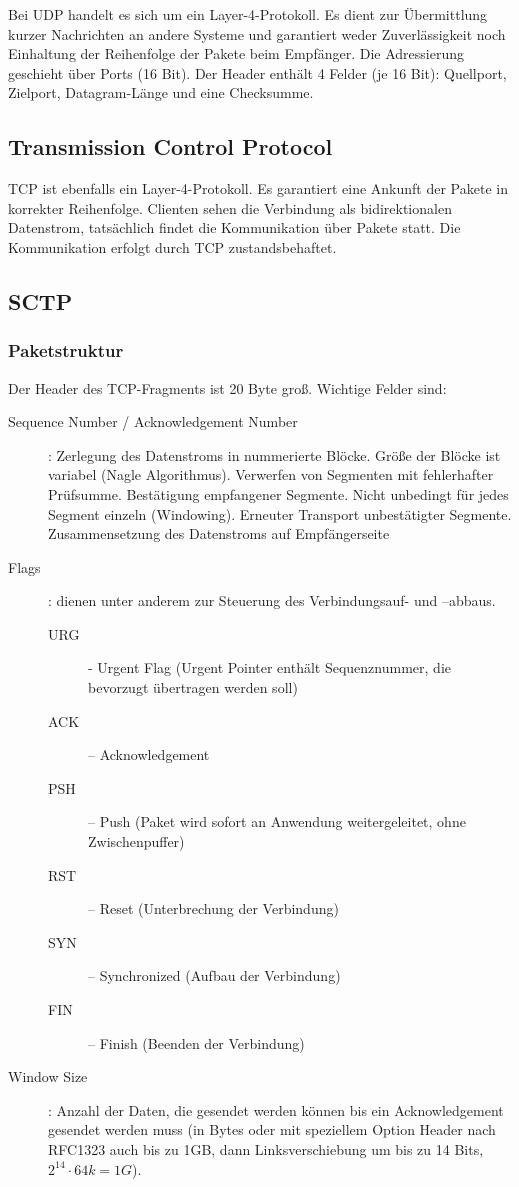 \documentclass{article} %
\begin{document}
Bei UDP handelt es sich um ein Layer-4-Protokoll.\cite{rfc768}
Es dient zur Übermittlung kurzer Nachrichten an andere Systeme und garantiert weder Zuverlässigkeit noch Einhaltung der Reihenfolge der Pakete beim Empfänger.
Die Adressierung geschieht über Ports (16 Bit).
Der Header enthält 4 Felder (je 16 Bit): Quellport, Zielport, Datagram-Länge und eine Checksumme.

\subsection{Transmission Control Protocol}
TCP ist ebenfalls ein Layer-4-Protokoll.\cite{rfc793}
Es garantiert eine Ankunft der Pakete in korrekter Reihenfolge.
Clienten sehen die Verbindung als bidirektionalen Datenstrom, tatsächlich findet die Kommunikation über Pakete statt. Die Kommunikation erfolgt durch TCP zustandsbehaftet.

\subsection{SCTP}


\subsubsection{Paketstruktur}

Der Header des TCP-Fragments ist 20 Byte groß.
Wichtige Felder sind:
\begin{description}
	\item [Sequence Number / Acknowledgement Number]: Zerlegung des Datenstroms in nummerierte Blöcke.
	Größe der Blöcke ist variabel (Nagle Algorithmus).
	Verwerfen von Segmenten mit fehlerhafter Prüfsumme.
	Bestätigung empfangener Segmente.
	Nicht unbedingt für jedes Segment einzeln (Windowing).
	Erneuter Transport unbestätigter Segmente.
	Zusammensetzung des Datenstroms auf Empfängerseite
	
	\item [Flags]: dienen unter anderem zur Steuerung des Verbindungsauf- und –abbaus.
	\begin{description}
		\item [URG] - Urgent Flag (Urgent Pointer enthält
			Sequenznummer, die bevorzugt übertragen werden soll)
		\item [ACK] – Acknowledgement
		\item [PSH] – Push (Paket wird sofort an Anwendung weitergeleitet, ohne Zwischenpuffer)
		\item [RST] – Reset (Unterbrechung der Verbindung)
		\item [SYN] – Synchronized (Aufbau der Verbindung)
		\item [FIN] – Finish (Beenden der Verbindung)
	\end{description}
	\item [Window Size]: Anzahl der Daten, die gesendet werden können bis ein Acknowledgement gesendet werden muss (in Bytes oder mit speziellem Option Header nach RFC1323 \cite{rfc1323} auch bis zu 1GB,	dann Linksverschiebung um bis zu 14 Bits, $2^{14} \cdot 64k = 1G$).
\end{description}
\end{document}
